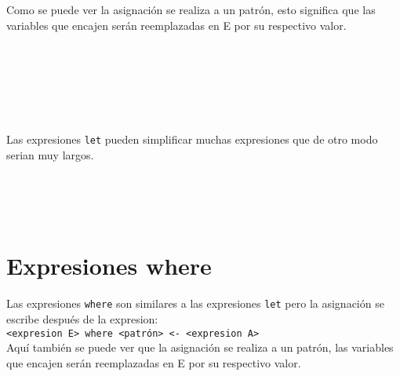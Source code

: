       Como se puede ver la asignación se realiza a un patrón, esto significa que las variables que encajen serán reemplazadas en E por su respectivo valor.
      
      \begin{fxcode}
         \\
         \\
         \\
         \\
         \\
      \end{fxcode}
      
      Las expresiones \texttt{let} pueden simplificar muchas expresiones que de otro modo serian muy largos.
      
      \begin{fxcode}
         \\
         \\
         \\
      \end{fxcode}
      
   \section{Expresiones where}
      Las expresiones \texttt{where} son similares a las expresiones \texttt{let} pero la asignación se escribe después de la expresion:
      \\
      
      \texttt{<expresion E>~where~<patrón>~<-~<expresion A>}
      \\
      
      Aquí también se puede ver que la asignación se realiza a un patrón, las variables que encajen serán reemplazadas en E por su respectivo valor.
      
